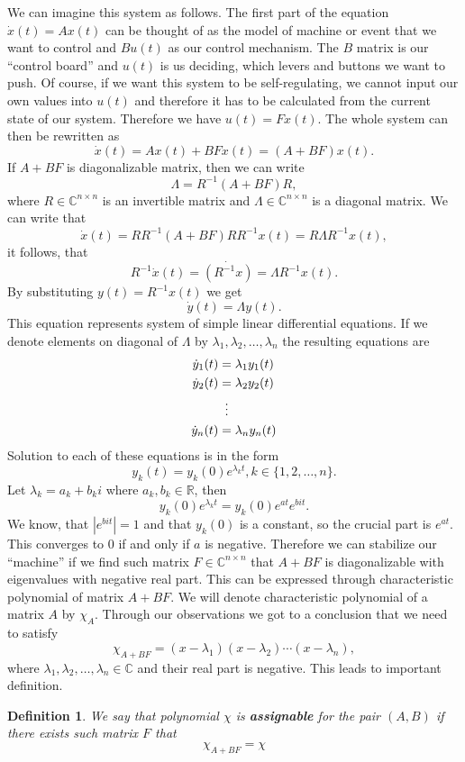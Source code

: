 \documentclass[12pt,a4paper]{report}
\newcommand{\R}{\mathbb{R}}
\newcommand{\C}{\mathbb{C}}
\newtheorem*{definition}{Definition}
\begin{document}
We can imagine this system as follows. The first part of the equation $\dot{x}(t)=Ax(t)$ can be thought of as the model of machine or event that we want to control and $Bu(t)$ as our control mechanism. The $B$ matrix is our ``control board'' and $u(t)$ is us deciding, which levers and buttons we want to push. Of course, if we want this system to be self-regulating, we cannot input our own values into $u(t)$ and therefore it has to be calculated from the current state of our system. Therefore we have $u(t)=Fx(t)$. The whole system can then be rewritten as $$\dot{x}(t)=Ax(t)+BFx(t)=(A+BF)x(t).$$ If $A+BF$ is diagonalizable matrix, then we can write $$\Lambda=R^{-1}(A+BF)R,$$ where $R \in \C ^{n \times n}$ is an invertible matrix and $\Lambda \in \C ^{n \times n}$ is a diagonal matrix. We can write that $$\dot{x}(t)=RR^{-1}(A+BF)RR^{-1}x(t)=R\Lambda R^{-1}x(t),$$ it follows, that $$R^{-1}\dot{x}(t)=\dot{(R^{-1}x)}=\Lambda R^{-1}x(t).$$ By substituting $y(t)=R^{-1}x(t)$ we get $$\dot{y}(t)=\Lambda y(t).$$ This equation represents system of simple linear differential equations. If we denote elements on diagonal of $\Lambda$ by $\lambda_1,\lambda_2,\ldots,\lambda_n$ the resulting equations are  
\begin{align*}
  \dot{y}_1(t)&=\lambda_1y_1(t) \\
  \dot{y}_2(t)&=\lambda_2y_2(t) \\
  &\vdotswithin{=} \\
  \dot{y}_n(t)&=\lambda_ny_n(t) 
\end{align*}
Solution to each of these equations is in the form 
$$y_k(t)=y_k(0)e^{\lambda_kt}, k\in\{1,2,\ldots,n\}.$$
Let $\lambda_k=a_k+b_ki$ where $a_k,b_k\in \R$, then 
$$y_k(0)e^{\lambda_kt}=y_k(0)e^{at}e^{bit}.$$ 
We know, that $|e^{bit}|=1$ and that $y_k(0)$ is a constant, so the crucial part is $e^{at}$. This converges to 0 if and only if $a$ is negative. Therefore we can stabilize our ``machine'' if we find such matrix $F \in \C^{n \times n}$ that $A+BF$ is diagonalizable with eigenvalues with negative real part. This can be expressed through characteristic polynomial of matrix $A+BF$. We will denote characteristic polynomial of a matrix $A$ by $\chi_A$. Through our observations we got to a conclusion that we need to satisfy $$\chi_{A+BF}=(x-\lambda_1)(x-\lambda_2)\cdots(x-\lambda_n),$$ where $\lambda_1,\lambda_2,\ldots,\lambda_n \in \C$ and their real part is negative. This leads to important definition.

\begin{definition}
	We say that polynomial $\chi$ is \textnormal{\textbf{assignable}} for the pair $(A,B)$ if there exists such matrix $F$ that $$\chi_{A+BF}=\chi$$
\end{definition}
\end{document}
